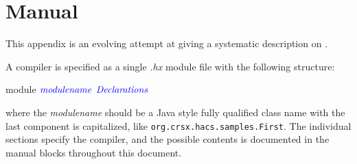 \documentclass[11pt]{article} %
\begin{document}
\appendix\small

\section{Manual}\label{app:manual}

This appendix is an evolving attempt at giving a systematic description on \HAX.

\begin{manual}\label{man:structure}
  A \HAX compiler is specified as a single \emph{.hx} module file with the following structure:
\begin{hacs}[mathescape,xleftmargin=\parindent]
module $\text{\it\color{blue}modulename}$
{
  $\text{\it\color{blue}Declarations}$
}
\end{hacs}
  where the \emph{modulename} should be a Java style fully qualified class name with the last
  component is capitalized, like \verb|org.crsx.hacs.samples.First|. The individual sections specify
  the compiler, and the possible contents is documented in the manual blocks throughout this
  document.
\end{manual}
\end{document}
